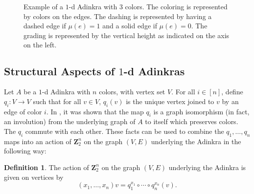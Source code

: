 \documentclass[12pt,twoside,singlespace]{article}
\numberwithin{equation}{section}
\theoremstyle{definition}
\newtheorem{definition}[equation]{Definition}
\newcommand{\ZZ}{\mathbf{Z}}
\begin{document}
\begin{figure}
\begin{center}
\caption{Example of a $1$-d Adinkra with $3$ colors. The coloring is represented by colors on the edges. The dashing is represented by having a dashed edge if $\mu(e)=1$ and a solid edge if $\mu(e)=0$. The grading is represented by the vertical height as indicated on the axis on the left.
\label{fig:1d-examples}}
\end{center}
\end{figure}


\subsection{Structural Aspects of $1$-d Adinkras}
\label{sec:code}

 Let $A$ be a $1$-d Adinkra with $n$ colors, with vertex set $V$.  For all $i\in [n]$, define $q_i:V\to V$ such that for all $v\in V$, $q_i(v)$ is the unique vertex joined to $v$ by an edge of color $i$.  In \cite{d2l:omni}, it was shown that the map $q_i$ is a graph isomorphism (in fact, an involution) from the underlying graph of $A$ to itself which preserves colors. The $q_i$ commute with each other. These facts can be used to combine the $q_1,\ldots, q_n$ maps into an action of $\ZZ_2^n$ on the graph $(V,E)$ underlying the Adinkra in the following way:
\begin{definition}
The action of $\ZZ_2^n$ on the graph $(V,E)$ underlying the Adinkra is given on vertices by
\[(x_1,\ldots,x_n)v=q_1^{x_1}\circ\cdots\circ q_n^{x_n}(v).\]
\end{definition}
\end{document}
